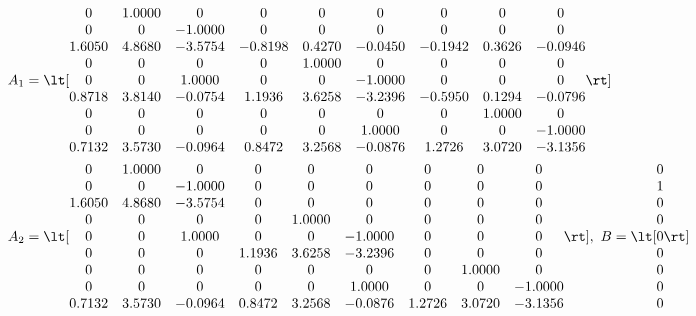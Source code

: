 {\scriptsize
\begin{align*}
& A_1 = \lt[\begin{matrix}
0  &  1.0000   &      0   &      0    &     0    &     0     &    0     &    0    &     0\\
         0    &     0  & -1.0000   &      0    &     0   &      0   &      0   &      0   &      0\\
    1.6050 &   4.8680 &  -3.5754 &  -0.8198  &  0.4270 &  -0.0450 &  -0.1942  &  0.3626  & -0.0946\\
         0   &      0     &    0    &     0  &  1.0000    &     0   &      0   &      0    &     0\\
         0   &      0 &   1.0000    &     0    &     0  & -1.0000   &      0    &     0    &     0\\
    0.8718  &  3.8140 &  -0.0754  &  1.1936 &   3.6258  & -3.2396  & -0.5950 &   0.1294 &  -0.0796\\
         0    &     0    &     0   &      0   &      0    &     0   &      0 &   1.0000   &      0\\
         0    &     0    &     0    &     0    &     0  &  1.0000      &   0    &     0  & -1.0000\\
    0.7132  &  3.5730 &  -0.0964  &  0.8472  &  3.2568 &  -0.0876  &  1.2726  &  3.0720 &  -3.1356
\end{matrix}\rt]\\
& A_2 = \lt[\begin{matrix}
 0   & 1.0000   &      0    &     0     &    0  &       0   &      0      &   0     &    0\\
         0    &     0  & -1.0000    &     0   &      0     &    0    &     0   &      0  &       0\\
    1.6050  &  4.8680  & -3.5754    &     0     &    0     &    0  &       0     &    0    &     0\\
         0   &      0   &      0    &     0   & 1.0000     &    0     &    0    &     0   &      0\\
         0  &       0  &  1.0000      &   0    &     0  & -1.0000   &      0  &       0  &       0\\
         0  &       0   &      0  &  1.1936  &  3.6258  & -3.2396   &      0     &    0   &      0\\
         0  &       0    &     0     &    0   &      0     &    0    &     0  &  1.0000    &     0\\
         0   &      0    &     0    &     0     &    0  &  1.0000    &     0      &   0 &  -1.0000\\
    0.7132 &   3.5730  & -0.0964 &   0.8472  &  3.2568 &  -0.0876 &   1.2726  &  3.0720  & -3.1356
\end{matrix}\rt],~B = \lt[\begin{matrix}
 0\\
     1\\
     0\\
     0\\
     0\\
     0\\
     0\\
     0\\
     0
\end{matrix}\rt]
\end{align*}
}


